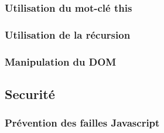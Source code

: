 \documentclass[a4paper]{article}
\begin{document}
		\subsubsection{Utilisation du mot-clé this}
		\subsubsection{Utilisation de la récursion}
		\subsubsection{Manipulation du DOM}
   \subsection{Securité} 
  		\subsubsection{Prévention des failles Javascript}
\end{document}
